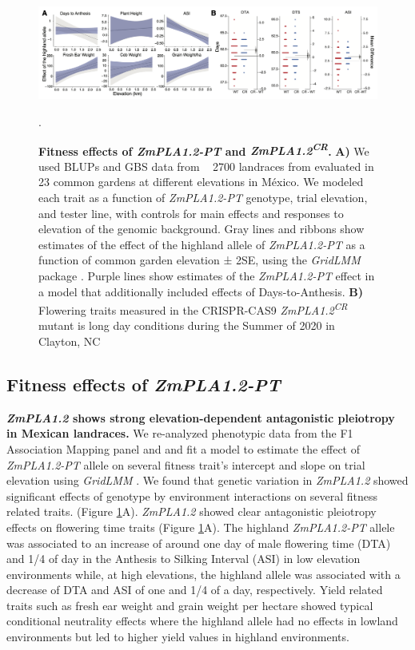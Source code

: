 \documentclass[9pt,twocolumn,twoside,lineno]{BioRxiv}
\begin{document}
\begin{figure}[!ht]
\begin{center}
\includegraphics[width=0.8\paperwidth]{Figures/Fig_4.png}
\caption{\textbf{Fitness effects of \textit{ZmPLA1.2-PT} and \textit{ZmPLA1.2\textsuperscript{CR}}.} 
\textbf{A)} We used BLUPs and GBS data from ~ 2700 landraces from \cite{Gates2019-xu} evaluated in 23 common gardens at different elevations in México. 
We modeled each trait as a function of \textit{ZmPLA1.2-PT} genotype, trial elevation, and tester line, with controls for main effects and responses to elevation of the genomic background. 
Gray lines and ribbons show estimates of the effect of the highland allele of \textit{ZmPLA1.2-PT} as a function of common garden elevation ± 2SE, using the \textit{GridLMM} package \cite{Runcie2019-Gr}. 
Purple lines show estimates of the \textit{ZmPLA1.2-PT} effect in a model that additionally included effects of Days-to-Anthesis.
\textbf{B)} Flowering traits measured in the CRISPR-CAS9 \textit{ZmPLA1.2\textsuperscript{CR}} mutant is long day conditions during the Summer of 2020 in Clayton, NC}. 
\label{Fig4}
\end{center}
\end{figure}

\subsection{Fitness effects of \textit{ZmPLA1.2-PT}}
\textbf{\textit{ZmPLA1.2} shows strong elevation-dependent antagonistic pleiotropy in Mexican landraces.} 
We re-analyzed phenotypic data from the F1 Association Mapping panel \cite{Romero_Navarro2017-cn} and \cite{Gates2019-xu} and fit a model to estimate the effect of \textit{ZmPLA1.2-PT} allele on several fitness trait's intercept and slope on trial elevation using \textit{GridLMM} \cite{Runcie2019-Gr}. 
We found that genetic variation in \textit{ZmPLA1.2} showed significant effects of genotype by environment interactions on several fitness related traits. (Figure \ref{Fig4}A). 
\textit{ZmPLA1.2} showed clear antagonistic pleiotropy effects on flowering time traits (Figure \ref{Fig4}A). 
The highland \textit{ZmPLA1.2-PT} allele was associated to an increase of around one day of male flowering time (DTA)  and 1/4 of day in the  Anthesis to Silking Interval (ASI) in low elevation environments while, at high elevations, the highland allele was associated with a decrease of DTA and ASI of one and 1/4 of a day, respectively.
Yield related traits such as fresh ear weight and grain weight per hectare showed typical conditional neutrality effects where the highland allele had no effects in lowland environments but led to higher yield values in highland environments.
\end{document}
